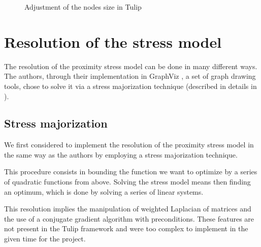 \documentclass[12pt]{report}
\begin{document}
\begin{figure}[h]
  \setlength\fboxsep{5pt}
  \setlength\fboxrule{0.5pt}
  \caption{Adjustment of the nodes size in Tulip}
  \label{graphTulip}
\end{figure}

\section{Resolution of the stress model}

The resolution of the proximity stress model can be done in many different ways. The authors, through their implementation in GraphViz \cite{Gansner02}, a set of graph drawing tools, chose to solve it via a stress majorization technique (described in details in \cite{Gansner05}). 

\subsection{Stress majorization}

We first considered to implement the resolution of the proximity stress model in the same way as the authors by employing a stress majorization technique.

This procedure consists in bounding the function we want to optimize by a series of quadratic functions from above. Solving the stress model means then finding an optimum, which is done by solving a series of linear systems.

\bigskip
This resolution implies the manipulation of weighted Laplacian of matrices and the use of a conjugate gradient algorithm with preconditions. These features are not present in the Tulip framework and were too complex to implement in the given time for the project. 
\end{document}
